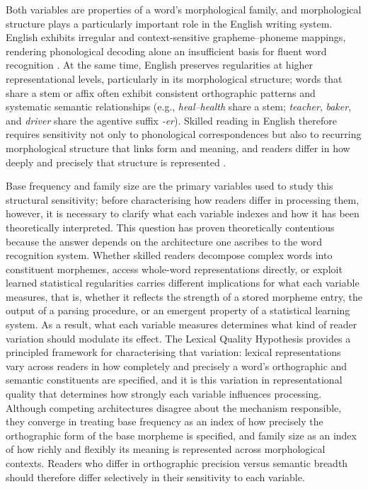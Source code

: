 \documentclass[utf8]{FrontiersinHarvard} %
\begin{document}
	Both variables are properties of a word's morphological family, and morphological structure plays a particularly important role in the English writing system. English exhibits irregular and context-sensitive grapheme–phoneme mappings, rendering phonological decoding alone an insufficient basis for fluent word recognition \citep{zieglerReadingAcquisitionDevelopmental2005, castlesHowDoesOrthographic2006}. At the same time, English preserves regularities at higher representational levels, particularly in its morphological structure; words that share a stem or affix often exhibit consistent orthographic patterns and systematic semantic relationships (e.g., \textit{heal–health} share a stem; \textit{teacher}, \textit{baker}, and \textit{driver} share the agentive suffix \textit{-er}). Skilled reading in English therefore requires sensitivity not only to phonological correspondences but also to recurring morphological structure that links form and meaning, and readers differ in how deeply and precisely that structure is represented \citep{bryantMorphologySpellingWhat2005, arciuliReadingStatisticalLearning2018, treimanStatisticalLearningSpelling2018}.
	
	Base frequency and family size are the primary variables used to study this structural sensitivity; before characterising how readers differ in processing them, however, it is necessary to clarify what each variable indexes and how it has been theoretically interpreted. This question has proven theoretically contentious because the answer depends on the architecture one ascribes to the word recognition system. Whether skilled readers decompose complex words into constituent morphemes, access whole-word representations directly, or exploit learned statistical regularities carries different implications for what each variable measures, that is, whether it reflects the strength of a stored morpheme entry, the output of a parsing procedure, or an emergent property of a statistical learning system. As a result, what each variable measures determines what kind of reader variation should modulate its effect. The Lexical Quality Hypothesis \citep{perfettiLexicalQualityHypothesis2002, perfettiReadingAbilityLexical2007, perfettiLexicalQualityRevisited2017} provides a principled framework for characterising that variation: lexical representations vary across readers in how completely and precisely a word's orthographic and semantic constituents are specified, and it is this variation in representational quality that determines how strongly each variable influences processing. Although competing architectures disagree about the mechanism responsible, they converge in treating base frequency as an index of how precisely the orthographic form of the base morpheme is specified, and family size as an index of how richly and flexibly its meaning is represented across morphological contexts. Readers who differ in orthographic precision versus semantic breadth should therefore differ selectively in their sensitivity to each variable.
	
\end{document}
